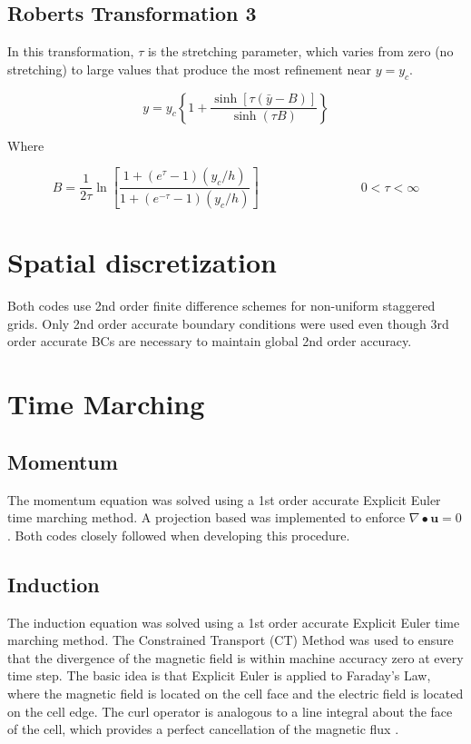 \documentclass[11pt]{article}
\begin{document}
\subsection{Roberts Transformation 3}
In this transformation, $\tau$ is the stretching parameter, which varies from zero (no stretching) to large values that produce the most refinement near $y=y_c$.

\begin{equation}
	y
	=
	y_c
	\left\{
	1
	+
	\frac{\sinh[\tau (\bar{y}-B)]}
	{\sinh(\tau B)}
	\right\}
\end{equation}

Where

\begin{equation}
	B
	=
	\frac{1}{2\tau}
	\ln 
	\left[
	\frac{1+(e^\tau-1) (y_c/h)}{1+(e^{-\tau}-1) (y_c/h)}
	\right]
	\qquad \qquad \qquad \qquad
	0 <\tau < \infty
\end{equation}


\section{Spatial discretization}
Both codes use 2nd order finite difference schemes for non-uniform staggered grids. Only 2nd order accurate boundary conditions were used even though 3rd order accurate BCs are necessary to maintain global 2nd order accuracy.

\section{Time Marching}
\subsection{Momentum}
The momentum equation was solved using a 1st order accurate Explicit Euler time marching method. A projection based was implemented to enforce $\nabla \bullet \pmb{u} = 0$. Both codes closely followed \cite{griebel1997numerical} when developing this procedure.

\subsection{Induction}
The induction equation was solved using a 1st order accurate Explicit Euler time marching method. The Constrained Transport (CT) Method was used to ensure that the divergence of the magnetic field is within machine accuracy zero at every time step. The basic idea is that Explicit Euler is applied to Faraday's Law, where the magnetic field is located on the cell face and the electric field is located on the cell edge. The curl operator is analogous to a line integral about the face of the cell, which provides a perfect cancellation of the magnetic flux \cite{Toth2000}.
\end{document}
